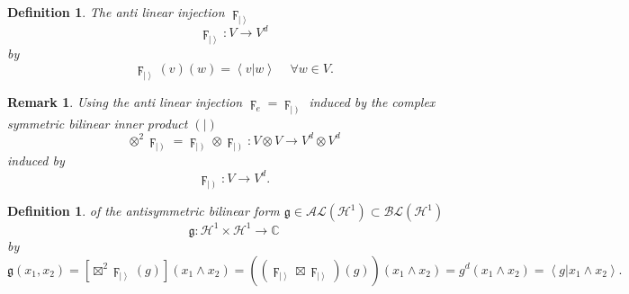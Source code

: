 \documentclass[aps,preprint]{revtex4}%
\newtheorem{definition}[theorem]{Definition}
\newtheorem{remark}[theorem]{Remark}
\begin{document}
\begin{definition}
The \emph{anti linear injection} $\digamma_{\left\vert {}\right\rangle }$%
\begin{equation}
\digamma_{\left\vert {}\right\rangle }:V\rightarrow V^{d}%
\end{equation}
by%
\begin{equation}
\digamma_{\left\vert {}\right\rangle }\left(  v\right)  \left(  w\right)
=\left\langle \left.  v\right\vert w\right\rangle \,\quad\forall w\in V.
\end{equation}

\end{definition}

\begin{remark}
Using the \emph{anti linear injection} $\digamma_{e}=\digamma_{\left\vert
{}\right)  }$ induced by the complex symmetric bilinear inner product $\left(
\left.  {}\right\vert \right)  $%
\begin{equation}
\otimes^{2}\digamma_{\left\vert {}\right)  }=\digamma_{\left\vert {}\right)
}\otimes\digamma_{\left\vert {}\right)  }:V\otimes V\rightarrow V^{d}\otimes
V^{d}%
\end{equation}
induced by
\begin{equation}
\digamma_{\left\vert {}\right)  }:V\rightarrow V^{d}.
\end{equation}

\end{remark}

\begin{definition}
of the antisymmetric bilinear form $\mathfrak{g\in\mathcal{AL}\left(
\mathcal{H}^{1}\right)  }\subset\mathcal{BL}\left(  \mathcal{H}^{1}\right)  $
\begin{equation}
\mathfrak{g:}\mathcal{H}^{1}\times\mathcal{H}^{1}\rightarrow\mathbb{C}%
\end{equation}
by
\begin{equation}
\mathfrak{g}\left(  x_{1},x_{2}\right)  =\left[  \boxtimes^{2}\digamma
_{\left\vert {}\right\rangle }\left(  g\right)  \right]  \left(  x_{1}\wedge
x_{2}\right)  =\left(  \overset{}{\left(  \digamma_{\left\vert {}\right\rangle
}\boxtimes\digamma_{\left\vert {}\right\rangle }\right)  \left(  g\right)
}\right)  \left(  x_{1}\wedge x_{2}\right)  =g^{d}\left(  x_{1}\wedge
x_{2}\right)  =\left\langle \left.  g\right\vert x_{1}\wedge x_{2}%
\right\rangle .
\end{equation}

\end{definition}
\end{document}
